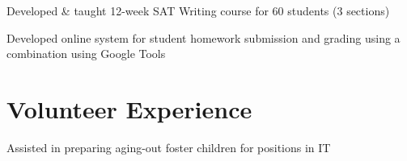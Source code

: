 \documentclass[letterpaper]{deedy-resume} %
\begin{document}
\begin{minipage}[t]{0.66\textwidth}
\begin{tightitemize}
\item Developed \& taught 12-week SAT Writing course for 60 students (3 sections)
\item Developed online system for student homework submission and grading using a combination using Google Tools 
\end{tightitemize} 


\section{Volunteer Experience}

%
\begin{tightitemize}
\item Assisted in preparing aging-out foster children for positions in IT
\end{tightitemize}
%
\sectionspace %


\end{minipage}
\end{document}
